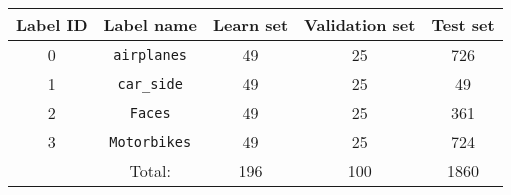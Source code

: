 \documentclass[a4paper,11pt,oneside]{article}
\begin{document}
\begin{center}
 \begin{tabular}{c c c c c}
 \hline
 Label ID & Label name & Learn set & Validation set & Test set \\ [0.5ex]
 \hline\hline
 0 & \lstinline!airplanes! & 49 & 25 & 726 \\
 \hline
 1 & \lstinline!car_side! & 49 & 25 & 49 \\
 \hline
 2 & \lstinline!Faces! & 49 & 25 & 361 \\
 \hline
 3 & \lstinline!Motorbikes! & 49 & 25 & 724 \\
 \hline\hline
  & Total: & 196 & 100 & 1860 \\
 \hline
\end{tabular}
\end{center}
\end{document}
